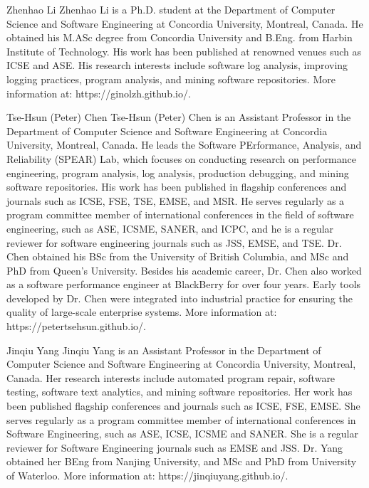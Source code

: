 \documentclass[10pt,journal,compsoc]{IEEEtran}
\begin{document}
\begin{IEEEbiography}{Zhenhao Li}
Zhenhao Li is a Ph.D. student at the Department of Computer Science and Software Engineering at Concordia University, Montreal, Canada. He obtained his M.ASc degree from Concordia University and B.Eng. from Harbin Institute of Technology. His work has been published at renowned venues such as ICSE and ASE.
His research interests include software log analysis, improving logging practices, program analysis, and mining software repositories. More information at: https://ginolzh.github.io/.
\end{IEEEbiography}


\begin{IEEEbiography}{Tse-Hsun (Peter) Chen}
Tse-Hsun (Peter) Chen is an Assistant Professor in the Department of Computer Science and Software Engineering at Concordia University, Montreal, Canada. He leads the Software PErformance, Analysis, and Reliability (SPEAR) Lab, which focuses on conducting research on performance engineering, program analysis, log analysis, production debugging, and mining software repositories. His work has been published in flagship conferences and journals such as ICSE, FSE, TSE, EMSE, and MSR. He serves regularly as a program committee member of international conferences in the field of software engineering, such as ASE, ICSME, SANER, and ICPC, and he is a regular reviewer for software engineering journals such as JSS, EMSE, and TSE. Dr. Chen obtained his BSc from the University of British Columbia, and MSc and PhD from Queen's University. Besides his academic career, Dr. Chen also worked as a software performance engineer at BlackBerry for over four years. Early tools developed by Dr. Chen were integrated into industrial practice for ensuring the quality of large-scale enterprise systems. More information at: https://petertsehsun.github.io/.
\end{IEEEbiography}

\begin{IEEEbiography}{Jinqiu Yang}
        Jinqiu Yang is an Assistant Professor in the Department of Computer Science and Software Engineering at Concordia University, Montreal, Canada. Her research interests include automated program repair, software testing, software text analytics, and mining software repositories. Her work has been published flagship conferences and journals such as ICSE, FSE, EMSE. She serves regularly as a program committee member of international conferences in Software Engineering, such as ASE, ICSE, ICSME and SANER. She is a regular reviewer for Software Engineering journals such as EMSE and JSS. Dr. Yang obtained her BEng from Nanjing University, and MSc and PhD from University of Waterloo. More information at: https://jinqiuyang.github.io/.
\end{IEEEbiography}
\end{document}
